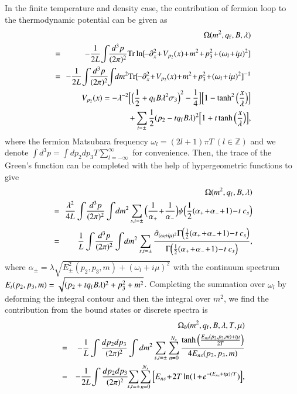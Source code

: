 \documentclass[aps,prd,amsmath,two column,amssymb,showpacs]{revtex4}
\begin{document}
In the finite temperature and density case, the contribution of fermion loop to the thermodynamic potential can be given as
\begin{eqnarray}
&&\Omega(m^2,q_{\rm f},B,\lambda)\nonumber\\
&=&\!\!-{1\over2L}\!\int\!\!{d^3p\over(2\pi)^2}{\rm Tr}\ln[\!-\partial^2_x\!+\!V_{p_2}(x)\!+\!m^2\!+\!p_3^2\!+\!(\omega_l\!+\!i\mu)^2]\nonumber\\
&=&\!\!-{1\over2L}\!\int\!\!{d^3p\over(2\pi)^2}\!\!\int\!\!{dm^2} {\rm Tr}[\!-\partial^2_x\!+\!V_{p_2}(x)\!+\!m^2\!+\!p_3^2\!+\!(\omega_l\!+\!i\mu)^2]^{-1}\nonumber\\
&&V_{p_2}(x)=-{\lambda^{-2}}\Big[\Big({1\over2}+q_{\rm f}B\lambda^2\sigma_3\Big)^2-{1\over4}\Big]\Big[1-\tanh^2\Big({x\over \lambda}\Big)\Big]\nonumber\\
&&\ \ \ \ \ \ \ \ \ \ \ \ \ \ \ \ \ +\sum_{t=\pm}{1\over2}(p_2-tq_{\rm f}B\lambda)^2\Big[1+t\tanh\Big({x\over \lambda}\Big)\Big],
\end{eqnarray}
where the fermion Matsubara frequency $\omega_l=(2l+1)\pi T\ (l\in\mathbb{Z})$ and we denote $\int d^3p=\int dp_2dp_3T\sum_{l=-\infty}^{\infty}$ for convenience. Then, the trace of the Green's function can be completed with the help of hypergeometric functions to give
\begin{eqnarray}\label{omega}
&&\Omega(m^2,q_{\rm f},B,\lambda)\nonumber\\
&=&\!\!{\lambda^2\over4L}\int\!{{d^3p\over(2\pi)^2}}\int\!{dm^2} \sum_{s,t=\pm}\Big({1\over\alpha_+}\!+\!{1\over\alpha_-}\Big){\psi\Big({1\over2}(\alpha_+\!+\!\alpha_-\!+\!1)\!-\!t~c_s\Big)}\nonumber\\
&=&{1\over L}\int\!{d^3p\over(2\pi)^2}\int\!{dm^2} \sum_{s,t=\pm}{\partial_{(\omega_l\!+\!i\mu)^2}\Gamma\Big({1\over2}(\alpha_+\!+\!\alpha_-\!+\!1)\!-\!t~c_s\Big)\over \Gamma\Big({1\over2}(\alpha_+\!+\!\alpha_-\!+\!1)\!-\!t~c_s\Big)},
\end{eqnarray}
where $\alpha_\pm={\lambda}\sqrt{E_{\pm}^2(p_2,p_3,m)+(\omega_l+i\mu)^2}$ with the continuum spectrum $E_{t}(p_2,p_3,m)=\sqrt{(p_2+tq_{\rm f}B\lambda)^2+p_3^2+m^2}$. Completing the summation over $\omega_l$ by deforming the integral contour and then the integral over $m^2$, we find the contribution from the bound states or discrete spectra is
\begin{eqnarray}\label{omegab}
&&\Omega_b(m^2,q_{\rm f},B,\lambda,T,\mu)\nonumber\\
&=&-{1\over L}\int{dp_2dp_3\over(2\pi)^2}\int{dm^2} \sum_{s,t=\pm}\sum_{n=0}^{N_s}{\tanh\Big({E_{ns}(p_2,p_3,m)+t\mu\over2T}\Big)\over4E_{ns}(p_2,p_3,m)}\nonumber\\
&=&-{1\over2L}\!\int{dp_2dp_3\over(2\pi)^2}\!\!\sum_{s,t=\pm}\!\sum_{n=0}^{N_s}\Big[E_{ns}\!+\!2T\ln(1\!+\!e^{-(E_{ns}+t\mu)/T})\Big],
\end{eqnarray}
\end{document}
